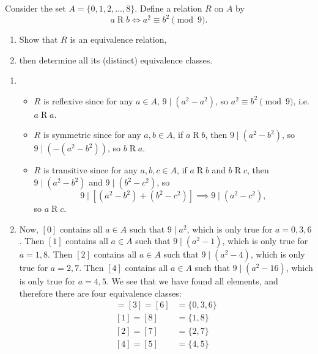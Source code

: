 \documentclass{article}
\theoremstyle{definition}
\begin{document}
\begin{question}
    Consider the set $A = \{0, 1, 2, \dots, 8 \}$. Define a relation $R$ on $A$ by
	\[
	a\mathrel{R}b \iff a^2 \equiv b^2 \pmod{9}.
	\]
	\begin{enumerate}
	\item Show that $R$ is an equivalence relation, 
	\item then determine all its (distinct) equivalence classes.
	\end{enumerate}
\end{question}
\begin{solution}
	\begin{enumerate}
	\item 
	\begin{itemize} 
		\item $ R$ is reflexive since for any $a \in A$, $9 \mid (a^2 - a^2)$, so $a^2 \equiv b^2 \pmod{9}$, i.e. $a \mathrel{R}a$.
		\item $ R$ is symmetric since for any $a,b \in A$, if $a \mathrel{R}b$, then $9 \mid (a^2 - b^2)$, so $9 \mid \left(- (a^2 - b^2)\right)$, so $b \mathrel{R}a$.
		\item $R$ is transitive since for any $a,b, c \in A$, if $a \mathrel{R}b$ and $b \mathrel{R}c$, then $9 \mid (a^2 - b^2)$ and $9 \mid (b^2 - c^2)$, so 
		\[
		9 \mid \left[(a^ 2 - b^2) + (b^2 - c^2)\right] 
		\implies 9 \mid (a^2 - c^2),
		\]
		so $a \mathrel{R}c$.
	\end{itemize}
	\item Now, $[0]$ contains all $a \in A$ such that $9 \mid a^2$, which is only true for $a = 0, 3, 6$. Then $[1]$ contains all $a \in A$ such that $9 \mid (a^2 - 1)$, which is only true for $a = 1, 8$. Then $[2]$ contains all $a \in A$ such that $9 \mid (a^2 - 4)$, which is only true for $a = 2, 7$. Then $[4]$ contains all $a \in A$ such that $9 \mid (a^2 - 16)$, which is only true for $a = 4, 5$. We see that we have found all elements, and therefore there are four equivalence classes:
		\begin{align*}
		[0] = [3] = [6] &= \{ 0, 3, 6 \} \\
		[1] = [8] &= \{ 1, 8 \} \\
		[2] = [7] &= \{ 2, 7 \} \\
		[4] = [5] &= \{ 4, 5 \}
		\end{align*}
	\end{enumerate}
\end{solution}
\end{document}
